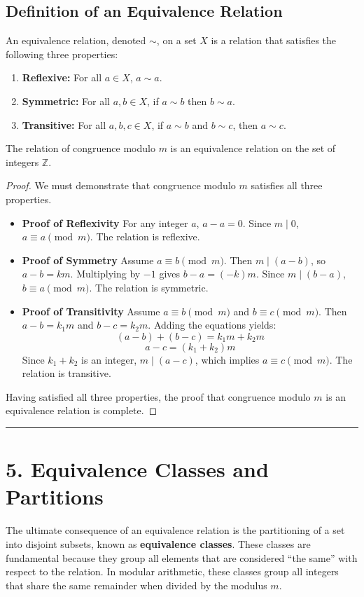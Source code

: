 \subsection*{Definition of an Equivalence Relation}
An equivalence relation, denoted $\sim$, on a set $X$ is a relation that satisfies the following three properties:
\begin{enumerate}
    \item \textbf{Reflexive:} For all $a \in X$, $a \sim a$.
    \item \textbf{Symmetric:} For all $a, b \in X$, if $a \sim b$ then $b \sim a$.
    \item \textbf{Transitive:} For all $a, b, c \in X$, if $a \sim b$ and $b \sim c$, then $a \sim c$.
\end{enumerate}

\begin{theorem}
The relation of congruence modulo $m$ is an equivalence relation on the set of integers $\mathbb{Z}$.
\end{theorem}

\begin{proof}
We must demonstrate that congruence modulo $m$ satisfies all three properties.
\begin{itemize}
    \item \textbf{Proof of Reflexivity} For any integer $a$, $a - a = 0$. Since $m \mid 0$, $a \equiv a \pmod{m}$. The relation is reflexive.
    \item \textbf{Proof of Symmetry} Assume $a \equiv b \pmod{m}$. Then $m \mid (a - b)$, so $a - b = km$. Multiplying by $-1$ gives $b - a = (-k)m$. Since $m \mid (b - a)$, $b \equiv a \pmod{m}$. The relation is symmetric.
    \item \textbf{Proof of Transitivity} Assume $a \equiv b \pmod{m}$ and $b \equiv c \pmod{m}$. Then $a - b = k_1m$ and $b - c = k_2m$. Adding the equations yields:
    $$ (a - b) + (b - c) = k_1m + k_2m $$
    $$ a - c = (k_1 + k_2)m $$
    Since $k_1 + k_2$ is an integer, $m \mid (a - c)$, which implies $a \equiv c \pmod{m}$. The relation is transitive.
\end{itemize}
Having satisfied all three properties, the proof that congruence modulo $m$ is an equivalence relation is complete.
\end{proof}

\hrule

\section*{5. Equivalence Classes and Partitions}
The ultimate consequence of an equivalence relation is the partitioning of a set into disjoint subsets, known as \textbf{equivalence classes}. These classes are fundamental because they group all elements that are considered ``the same'' with respect to the relation. In modular arithmetic, these classes group all integers that share the same remainder when divided by the modulus $m$.

